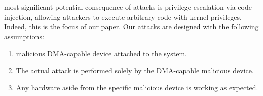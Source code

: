 \DIFdelbegin {}\DIFdelend \DIFaddbegin {}\DIFaddend most significant potential consequence of \DIFdelbegin {}\DIFdelend \DIFaddbegin {}\DIFaddend attacks is privilege escalation via code injection, allowing attackers to execute arbitrary code with kernel privileges. Indeed, this is the focus of our paper. 
Our attacks are designed with the following assumptions:
\begin{enumerate}
    \item \DIFdelbegin {}\DIFdelend \DIFaddbegin {}\DIFaddend malicious DMA-capable device \DIFaddbegin {}\DIFaddend attached to the system.
    \item The actual attack is performed solely by the DMA-capable malicious device.
    \item Any hardware aside from the specific malicious device is working as expected.
 \end{enumerate}








